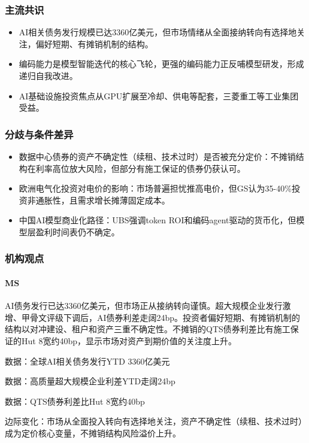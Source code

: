 \documentclass[11pt]{ctexart}
\begin{document}
\subsubsection*{主流共识}
\begin{itemize}
  \item AI相关债务发行规模已达3360亿美元，但市场情绪从全面接纳转向有选择地关注，偏好短期、有摊销机制的结构。
  \item 编码能力是模型智能迭代的核心飞轮，更强的编码能力正反哺模型研发，形成递归自我改进。
  \item AI基础设施投资焦点从GPU扩展至冷却、供电等配套，三菱重工等工业集团受益。
\end{itemize}
\subsubsection*{分歧与条件差异}
\begin{itemize}
  \item 数据中心债券的资产不确定性（续租、技术过时）是否被充分定价：不摊销结构在利率高位放大风险，但部分有施工保证的债券仍获认可。
  \item 欧洲电气化投资对电价的影响：市场普遍担忧推高电价，但GS认为35-40\%投资非通胀性，且需求增长摊薄固定成本。
  \item 中国AI模型商业化路径：UBS强调token ROI和编码agent驱动的货币化，但模型层盈利时间表仍不确定。
\end{itemize}
\subsubsection*{机构观点}
\paragraph{MS} AI债务发行已达3360亿美元，但市场正从接纳转向谨慎。超大规模企业发行激增、甲骨文评级下调后，AI债券利差走阔24bp。投资者偏好短期、有摊销机制的结构以对冲建设、租户和资产三重不确定性。不摊销的QTS债券利差比有施工保证的Hut 8宽约40bp，显示市场对资产到期价值的关注度上升。
{\small\color{refgray}数据：全球AI相关债务发行YTD 3360亿美元\par}
{\small\color{refgray}数据：高质量超大规模企业利差YTD走阔24bp\par}
{\small\color{refgray}数据：QTS债券利差比Hut 8宽约40bp\par}
{\small\color{refgray}边际变化：市场从全面投入转向有选择地关注，资产不确定性（续租、技术过时）成为定价核心变量，不摊销结构风险溢价上升。\par}
\end{document}
